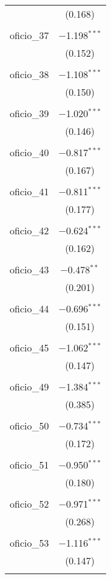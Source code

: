 \begin{table}[!htbp]
\begin{tabular}{@{\extracolsep{5pt}}lc}
  & (0.168) \\ 
  & \\ 
 oficio\_37 & $-$1.198$^{***}$ \\ 
  & (0.152) \\ 
  & \\ 
 oficio\_38 & $-$1.108$^{***}$ \\ 
  & (0.150) \\ 
  & \\ 
 oficio\_39 & $-$1.020$^{***}$ \\ 
  & (0.146) \\ 
  & \\ 
 oficio\_40 & $-$0.817$^{***}$ \\ 
  & (0.167) \\ 
  & \\ 
 oficio\_41 & $-$0.811$^{***}$ \\ 
  & (0.177) \\ 
  & \\ 
 oficio\_42 & $-$0.624$^{***}$ \\ 
  & (0.162) \\ 
  & \\ 
 oficio\_43 & $-$0.478$^{**}$ \\ 
  & (0.201) \\ 
  & \\ 
 oficio\_44 & $-$0.696$^{***}$ \\ 
  & (0.151) \\ 
  & \\ 
 oficio\_45 & $-$1.062$^{***}$ \\ 
  & (0.147) \\ 
  & \\ 
 oficio\_49 & $-$1.384$^{***}$ \\ 
  & (0.385) \\ 
  & \\ 
 oficio\_50 & $-$0.734$^{***}$ \\ 
  & (0.172) \\ 
  & \\ 
 oficio\_51 & $-$0.950$^{***}$ \\ 
  & (0.180) \\ 
  & \\ 
 oficio\_52 & $-$0.971$^{***}$ \\ 
  & (0.268) \\ 
  & \\ 
 oficio\_53 & $-$1.116$^{***}$ \\ 
  & (0.147) \\ 
  & \\ 

\end{tabular}
\end{table}
